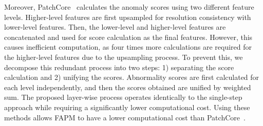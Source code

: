 \documentclass{article}
\begin{document}
Moreover, PatchCore~\cite{patchcore} calculates the anomaly scores using two different feature levels. Higher-level features are first upsampled for resolution consistency with lower-level features. Then, the lower-level and higher-level features are concatenated and used for score calculation as the final features. However, this causes inefficient computation, as four times more calculations are required for the higher-level features due to the upsampling process. To prevent this, we decompose this redundant process into two steps: 1) separating the score calculation and 2) unifying the scores. Abnormality scores are first calculated for each level independently, and then the scores obtained are unified by weighted sum. The proposed layer-wise process operates identically to the single-step approach while requiring a significantly lower computational cost. Using these methods allows FAPM to have a lower computational cost than PatchCore~\cite{patchcore}.
\end{document}
